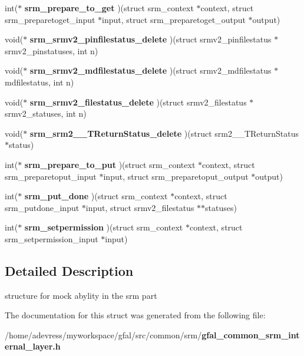 \begin{CompactItemize}
\item 
int($\ast$ \textbf{srm\_\-prepare\_\-to\_\-get} )(struct srm\_\-context $\ast$context, struct srm\_\-preparetoget\_\-input $\ast$input, struct srm\_\-preparetoget\_\-output $\ast$output)\label{struct__gfal__srm__external__call_25c2f8ab6c8702cec864d41cc86a502d}

\item 
void($\ast$ \textbf{srm\_\-srmv2\_\-pinfilestatus\_\-delete} )(struct srmv2\_\-pinfilestatus $\ast$srmv2\_\-pinstatuses, int n)\label{struct__gfal__srm__external__call_755de3bb11627d248e340aec4f6db49b}

\item 
void($\ast$ \textbf{srm\_\-srmv2\_\-mdfilestatus\_\-delete} )(struct srmv2\_\-mdfilestatus $\ast$mdfilestatus, int n)\label{struct__gfal__srm__external__call_8334ed4e5c1835eeb209c02d68f39939}

\item 
void($\ast$ \textbf{srm\_\-srmv2\_\-filestatus\_\-delete} )(struct srmv2\_\-filestatus $\ast$srmv2\_\-statuses, int n)\label{struct__gfal__srm__external__call_a3bd168b26c0c5b613f2ebd66d903fb2}

\item 
void($\ast$ \textbf{srm\_\-srm2\_\-\_\-TReturn\-Status\_\-delete} )(struct srm2\_\-\_\-TReturn\-Status $\ast$status)\label{struct__gfal__srm__external__call_d3600d77afae102a47cc323f60da5d3d}

\item 
int($\ast$ \textbf{srm\_\-prepare\_\-to\_\-put} )(struct srm\_\-context $\ast$context, struct srm\_\-preparetoput\_\-input $\ast$input, struct srm\_\-preparetoput\_\-output $\ast$output)\label{struct__gfal__srm__external__call_2d6805aad81a6c52b7fdc5d6b1de93b4}

\item 
int($\ast$ \textbf{srm\_\-put\_\-done} )(struct srm\_\-context $\ast$context, struct srm\_\-putdone\_\-input $\ast$input, struct srmv2\_\-filestatus $\ast$$\ast$statuses)\label{struct__gfal__srm__external__call_87fb595d2291d717337cfe621fb0d16f}

\item 
int($\ast$ \textbf{srm\_\-setpermission} )(struct srm\_\-context $\ast$context, struct srm\_\-setpermission\_\-input $\ast$input)\label{struct__gfal__srm__external__call_044bbb0145983c9757373f50544c947d}

\end{CompactItemize}


\subsection{Detailed Description}
structure for mock abylity in the srm part 



The documentation for this struct was generated from the following file:\begin{CompactItemize}
\item 
/home/adevress/myworkspace/gfal/src/common/srm/\bf{gfal\_\-common\_\-srm\_\-internal\_\-layer.h}\end{CompactItemize}

